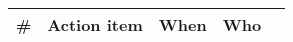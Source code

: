 \begin{longtable}{ccccX}
\toprule
\textbf{\#} & \textbf{Action item} & \textbf{When} & \textbf{Who}

\\ \bottomrule
\end{longtable}
